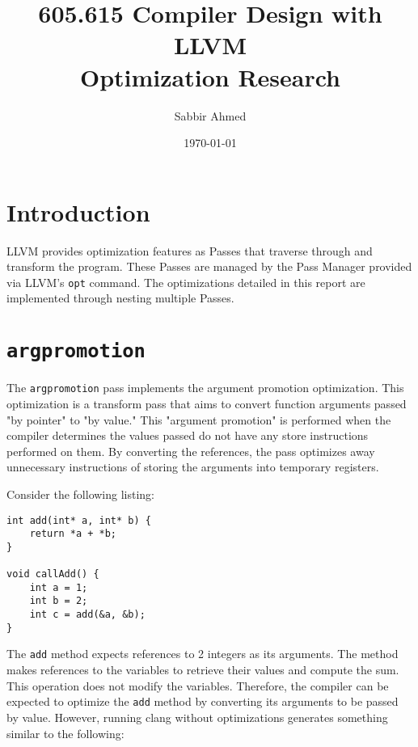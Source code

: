 \documentclass{article}
\title{605.615 Compiler Design with LLVM \\ Optimization Research}
\author{Sabbir Ahmed}
\date{\today}
\begin{document}
\maketitle


\section{Introduction} LLVM provides optimization features as Passes that traverse through and transform the program. \cite{passes} These Passes are managed by the Pass Manager provided via LLVM's \texttt{opt} command. The optimizations detailed in this report are implemented through nesting multiple Passes.

\section{\texttt{argpromotion}} The \texttt{argpromotion} pass implements the argument promotion optimization. This optimization is a transform pass that aims to convert function arguments passed "by pointer" to "by value." \cite{argpromotion-src} This "argument promotion" is performed when the compiler determines the values passed do not have any store instructions performed on them. By converting the references, the pass optimizes away unnecessary instructions of storing the arguments into temporary registers.

Consider the following listing:

\begin{lstlisting}[caption=A method to return the sum of 2 integers,style=customC++]
int add(int* a, int* b) {
    return *a + *b;
}

void callAdd() {
    int a = 1;
    int b = 2;
    int c = add(&a, &b);
}
\end{lstlisting}

The \texttt{add} method expects references to 2 integers as its arguments. The method makes references to the variables to retrieve their values and compute the sum. This operation does not modify the variables. Therefore, the compiler can be expected to optimize the \texttt{add} method by converting its arguments to be passed by value. However, running clang without optimizations
generates something similar to the following:
\end{document}
